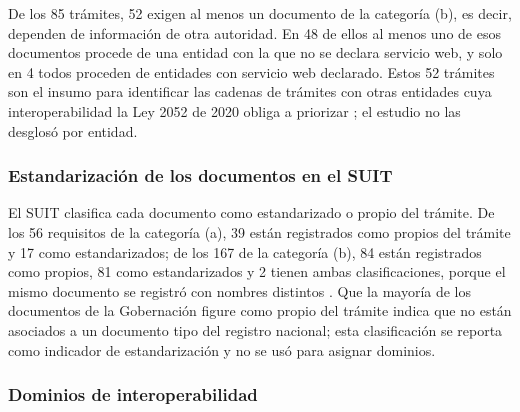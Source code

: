 De los 85 trámites, 52 exigen al menos un documento de la categoría (b), es decir, dependen de información de otra autoridad. En 48 de ellos al menos uno de esos documentos procede de una entidad con la que no se declara servicio web, y solo en 4 todos proceden de entidades con servicio web declarado. Estos 52 trámites son el insumo para identificar las cadenas de trámites con otras entidades cuya interoperabilidad la Ley 2052 de 2020 obliga a priorizar \parencite[art.~8]{colombia2020ley2052}; el estudio no las desglosó por entidad.

\subsubsection{Estandarización de los documentos en el SUIT}

El SUIT clasifica cada documento como estandarizado o propio del trámite. De los 56 requisitos de la categoría (a), 39 están registrados como propios del trámite y 17 como estandarizados; de los 167 de la categoría (b), 84 están registrados como propios, 81 como estandarizados y 2 tienen ambas clasificaciones, porque el mismo documento se registró con nombres distintos \parencite{funcionpublica2026visorsuit}. Que la mayoría de los documentos de la Gobernación figure como propio del trámite indica que no están asociados a un documento tipo del registro nacional; esta clasificación se reporta como indicador de estandarización y no se usó para asignar dominios.

\subsubsection{Dominios de interoperabilidad}

